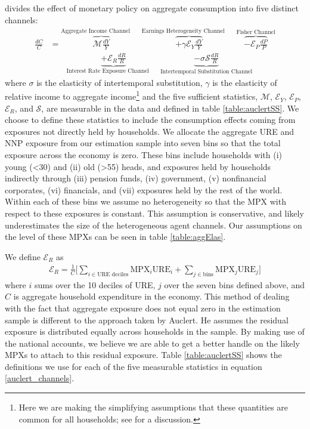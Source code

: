 \documentclass[titlepage]{\econtex}\newcommand{\texname}{ConsumptionHeterogeneity}
\begin{document}
\cite{auclert_monetary_2017} divides the effect of monetary policy on aggregate consumption into five distinct channels:
\begingroup
\allowdisplaybreaks[0]
\begin{align} 
\frac{dC}{C} &= \overbrace{\mathcal{M}\frac{dY}{Y}}^{\text{Aggregate Income Channel}\qquad} \overbrace{ + \gamma \mathcal{E}_Y \frac{dY}{Y}}^{\text{Earnings Heterogeneity Channel}\qquad} \overbrace{ - \mathcal{E}_P\frac{dP}{P}}^{\text{Fisher Channel}}  \nonumber \\
& \qquad \underbrace{ + \mathcal{E}_R \frac{dR}{R}}_{\text{Interest Rate Exposure Channel}\qquad}  \underbrace{ - \sigma \mathcal{S}\frac{dR}{R}}_{\text{Intertemporal Substitution Channel}} \label{auclert_channels}
\end{align}
\endgroup
where $\sigma$ is the elasticity of intertemporal substitution, $\gamma$ is the elasticity of relative income to aggregate income\footnote{Here we are making the simplifying assumptions that these quantities are common for all households; see \cite{auclert_monetary_2017} for a discussion.} and the five sufficient statistics, $\mathcal{M}$, $\mathcal{E}_Y$, $\mathcal{E}_P$, $\mathcal{E}_R$, and $\mathcal{S}$, are measurable in the data and defined in table \ref{table:auclertSS}. We choose to define these statistics to include the consumption effects coming from exposures not directly held by households. We allocate the aggregate URE and NNP exposure from our estimation sample into seven bins so that the total exposure across the economy is zero. These bins include households with (i) young (<30) and (ii) old (>55) heads, and exposures held by households indirectly through (iii) pension funds, (iv) government, (v) nonfinancial corporates, (vi) financials, and (vii) exposures held by the rest of the world. Within each of these bins we assume no heterogeneity so that the MPX with respect to these exposures is constant. This assumption is conservative, and likely underestimates the size of the heterogeneous agent channels. Our assumptions on the level of these MPXs can be seen in table \ref{table:aggElas}.

We define $\mathcal{E}_R$ as
\begin{align}
\mathcal{E}_R = \frac{1}{C}\Bigg[ \sum_{i \in \text{URE deciles} } \text{MPX}_i \text{URE}_i + \sum_{j \in \text{bins}} \text{MPX}_j \text{URE}_j \Bigg]
\end{align}
where $i$ sums over the 10 deciles of URE, $j$ over the seven bins defined above, and $C$ is aggregate household expenditure in the economy. This method of dealing with the fact that aggregate exposure does not equal zero in the estimation sample is different to the approach taken by Auclert. He assumes the residual exposure is distributed equally across households in the sample. By making use of the national accounts, we believe we are able to get a better handle on the likely MPXs to attach to this residual exposure. Table \ref{table:auclertSS} shows the definitions we use for each of the five measurable statistics in equation \ref{auclert_channels}.
\end{document}

